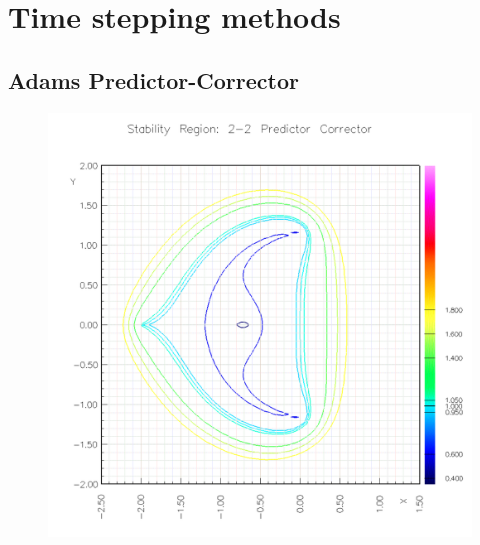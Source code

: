 \section{Time stepping methods}


\subsection{Adams Predictor-Corrector}

{
\newcommand{\figWidtha}{.475\linewidth}
\begin{figure}[hbt]
  \begin{center}
   \includegraphics[width=\figWidtha]{./fig/adamsPECE22}

\end{center}
\end{figure}}
